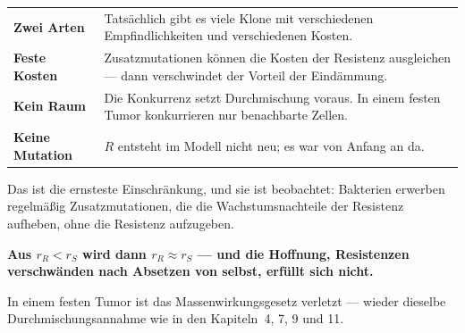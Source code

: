 \begin{warnung}
\begin{center}
{\small
\renewcommand{\arraystretch}{1.5}
\begin{tabular}{@{}P{2.4cm}P{6.2cm}@{}}
\toprule
\textbf{Zwei Arten} & Tatsächlich gibt es viele Klone mit verschiedenen Empfindlichkeiten und verschiedenen Kosten.\\
\textbf{Feste Kosten} & Zusatzmutationen können die Kosten der Resistenz ausgleichen --- dann verschwindet der Vorteil der Eindämmung.\\
\textbf{Kein Raum} & Die Konkurrenz setzt Durchmischung voraus. In einem festen Tumor konkurrieren nur benachbarte Zellen.\\
\textbf{Keine Mutation} & $R$ entsteht im Modell nicht neu; es war von Anfang an da.\\
\bottomrule
\end{tabular}}
\end{center}

Das ist die ernsteste Einschränkung, und sie ist beobachtet: Bakterien erwerben regelmäßig Zusatzmutationen, die die Wachstumsnachteile der Resistenz aufheben, ohne die Resistenz aufzugeben.

\begin{center}
\begin{minipage}{0.9\textwidth}
\textbf{Aus $r_R < r_S$ wird dann $r_R \approx r_S$ --- und die Hoffnung, Resistenzen verschwänden nach Absetzen von selbst, erfüllt sich nicht.}
\end{minipage}
\end{center}

In einem festen Tumor ist das Massenwirkungsgesetz verletzt --- wieder dieselbe Durchmischungsannahme wie in den Kapiteln~4, 7, 9 und 11.

\begin{center}
\begin{minipage}{0.88\textwidth}
\end{minipage}
\end{center}
\end{warnung}

